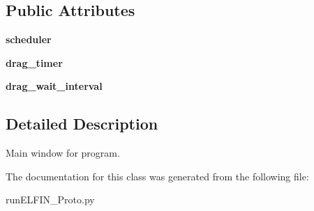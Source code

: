 \subsection*{Public Attributes}
\begin{DoxyCompactItemize}
\item 
\hypertarget{classrunELFIN__Proto_1_1MyMainWindow_a45e7c63b1e0cbe5cee870efa69b1f983}{{\bfseries scheduler}}\label{classrunELFIN__Proto_1_1MyMainWindow_a45e7c63b1e0cbe5cee870efa69b1f983}

\item 
\hypertarget{classrunELFIN__Proto_1_1MyMainWindow_a5ecf9793b56752f03a542b4ade9a7827}{{\bfseries drag\-\_\-timer}}\label{classrunELFIN__Proto_1_1MyMainWindow_a5ecf9793b56752f03a542b4ade9a7827}

\item 
\hypertarget{classrunELFIN__Proto_1_1MyMainWindow_a20694434bff9a7129222d3319e40cf9e}{{\bfseries drag\-\_\-wait\-\_\-interval}}\label{classrunELFIN__Proto_1_1MyMainWindow_a20694434bff9a7129222d3319e40cf9e}

\end{DoxyCompactItemize}


\subsection{Detailed Description}
Main window for program. 

The documentation for this class was generated from the following file\-:\begin{DoxyCompactItemize}
\item 
run\-E\-L\-F\-I\-N\-\_\-\-Proto.\-py\end{DoxyCompactItemize}
